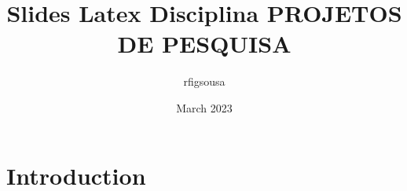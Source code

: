 \documentclass{article}
\title{Slides Latex Disciplina PROJETOS DE PESQUISA}
\author{rfigsousa }
\date{March 2023}
\begin{document}
\maketitle

\section{Introduction}
\end{document}
